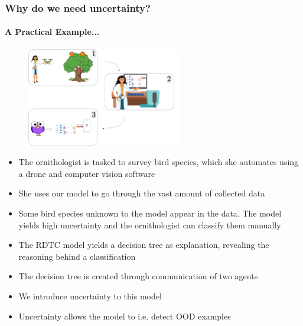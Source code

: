 \documentclass[9pt]{beamer}
\begin{document}
\begin{frame}
\frametitle{Why do we need uncertainty?}
\framesubtitle{A Practical Example...}
	\begin{figure}
		\centering
		\includegraphics[width=0.6\textwidth]{images/ornithology.pdf}
	\end{figure}
	\begin{itemize}\setlength\itemsep{1em}
	\item The ornithologist is tasked to survey bird species, which she automates using a drone and computer vision software
	\item She uses our model to go through the vast amount of collected data
	\item Some bird species unknown to the model appear in the data. The model yields high uncertainty and the ornithologist can classify them manually
	\end{itemize}
\end{frame}

\begin{frame}[plain]
\begin{itemize}
	\item The RDTC model yields a decision tree as explanation, revealing the reasoning behind a classification
	\item The decision tree is created through communication of two agents 
	\item We introduce uncertainty to this model
	\item Uncertainty allows the model to i.e. detect OOD examples
\end{itemize}
\end{frame}
\end{document}
